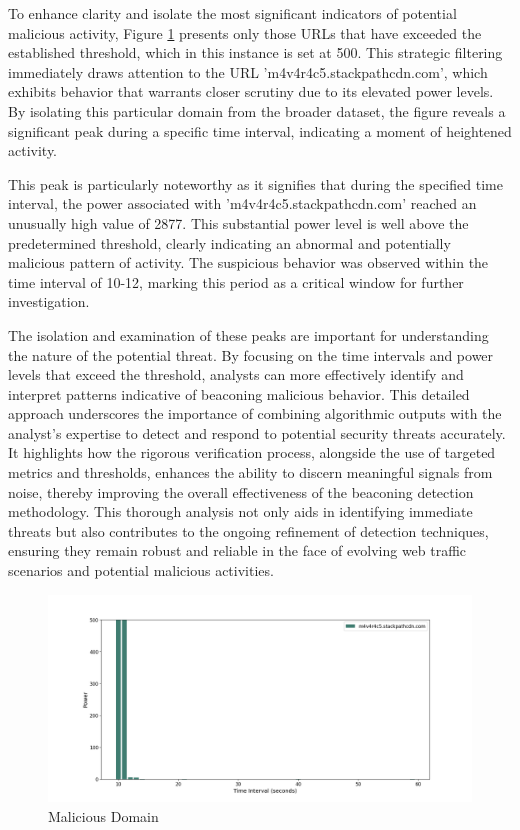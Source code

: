 To enhance clarity and isolate the most significant indicators of potential malicious activity, Figure \ref{fig:malicious} presents only those URLs that have exceeded the established threshold, which in this instance is set at 500. This strategic filtering immediately draws attention to the URL 'm4v4r4c5.stackpathcdn.com', which exhibits behavior that warrants closer scrutiny due to its elevated power levels. By isolating this particular domain from the broader dataset, the figure reveals a significant peak during a specific time interval, indicating a moment of heightened activity.

This peak is particularly noteworthy as it signifies that during the specified time interval, the power associated with 'm4v4r4c5.stackpathcdn.com' reached an unusually high value of 2877. This substantial power level is well above the predetermined threshold, clearly indicating an abnormal and potentially malicious pattern of activity. The suspicious behavior was observed within the time interval of 10-12, marking this period as a critical window for further investigation.

The isolation and examination of these peaks are important for understanding the nature of the potential threat. By focusing on the time intervals and power levels that exceed the threshold, analysts can more effectively identify and interpret patterns indicative of beaconing malicious behavior. This detailed approach underscores the importance of combining algorithmic outputs with the analyst's expertise to detect and respond to potential security threats accurately. It highlights how the rigorous verification process, alongside the use of targeted metrics and thresholds, enhances the ability to discern meaningful signals from noise, thereby improving the overall effectiveness of the beaconing detection methodology. This thorough analysis not only aids in identifying immediate threats but also contributes to the ongoing refinement of detection techniques, ensuring they remain robust and reliable in the face of evolving web traffic scenarios and potential malicious activities.

\begin{figure}
    \centering
    \includegraphics[width=\textwidth]{../Thesis_Docs/media/specialmalicious.png}
    \caption{Malicious Domain}
    \label{fig:malicious}
\end{figure} 

